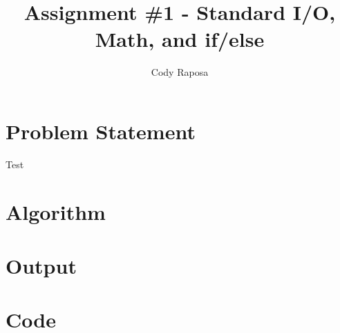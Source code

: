 \documentclass{article}
\title{Assignment \#1 - Standard I/O, Math, and if/else}
\author{Cody Raposa}
\affil{ELEC2850 Microcontrollers Using C Programming}
\begin{document}
\maketitle
\begin{flushleft}
  \section{Problem Statement}
  Test
  \section{Algorithm}
  \section{Output}
  \section{Code}
  
\end{flushleft}
\end{document}
